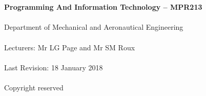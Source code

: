 \begin{titlepage}
    \thispagestyle{empty}
    \\~\\[18cm]
    \large
    \textbf{Programming And Information Technology -- MPR213} \\~\\
    Department of Mechanical and Aeronautical Engineering \\~\\[0.5cm]
    \normalsize
    Lecturers: Mr LG Page and  Mr SM Roux \\~\\
    Last Revision: 18 January 2018 \\~\\[0.5em]
    \textcopyright \quad Copyright reserved \\~\\
\end{titlepage}
\restoregeometry
